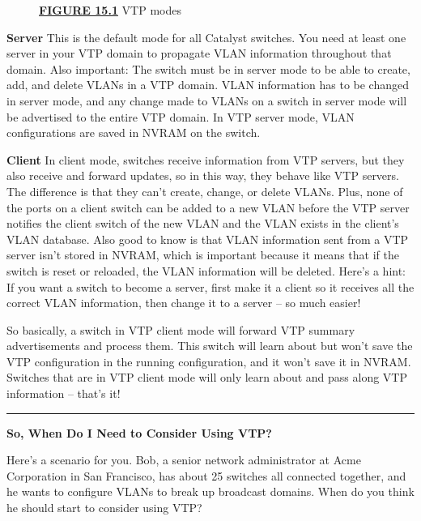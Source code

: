 \begin{figure}
\centering
\caption{{\protect\hyperlink{c15.xhtmlux5cux23figureanchor15-1}{\textbf{FIGURE
15.1}} VTP modes}}
\end{figure}

\textbf{Server} This
is the default mode for all Catalyst switches. You need at least one
server in your VTP domain to propagate VLAN information throughout that
domain. Also important: The switch must be in server mode to be able to
create, add, and delete VLANs in a VTP domain. VLAN information has to
be changed in server mode, and any change made to VLANs on a switch in
server mode will be advertised to the entire VTP domain. In VTP server
mode, VLAN configurations are saved in NVRAM on the switch.

\textbf{Client} In client mode, switches receive information from VTP
servers, but they also receive and forward updates, so in this way, they
behave like VTP servers. The difference is that they can't create,
change, or delete VLANs. Plus, none of the ports on a client switch can
be added to a new VLAN before the VTP server notifies the client switch
of the new VLAN and the VLAN exists in the client's VLAN database. Also
good to know is that VLAN information sent from a VTP server isn't
stored in NVRAM, which is important because it means that if the switch
is reset or reloaded, the VLAN information will be deleted. Here's a
hint: If you want a switch to become a server, first make it a client so
it receives all the correct VLAN information, then change it to a
server -- so much easier!

So basically, a switch in VTP client mode will forward VTP summary
advertisements and process them. This switch will learn about but won't
save the VTP configuration in the running configuration, and it won't
save it in NVRAM. Switches that are in VTP client mode will only learn
about and pass along VTP information -- that's it!

\begin{center}\rule{0.5\linewidth}{0.5pt}\end{center}

\textbf{So, When Do I Need to Consider Using VTP?}

Here's a scenario for you. Bob, a senior network administrator at Acme
Corporation in San Francisco, has about 25 switches all connected
together, and he wants to configure VLANs to break up broadcast domains.
When do you think he should start to consider using VTP?

